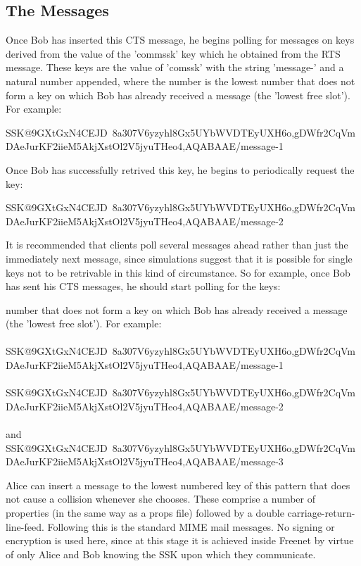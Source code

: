 \documentclass[12pt,a4paper]{article}
\begin{document}
\subsection{The Messages}
Once Bob has inserted this CTS message, he begins polling for messages on keys derived from the value of the 'commssk' key which he obtained from the RTS message. These keys are the value of 'comssk' with the string 'message-' and a natural number appended, where the number is the lowest number that does not form a key on which Bob has already received a message (the 'lowest free slot'). For example:

SSK@9GXtGxN4CEJD~8a30\-7V6yzyhl8Gx5UYb\-WVDTEyUXH6o,gDWfr2CqVmDAeJ\-urKF2iieM5AkjXs\-tOl2V5jyuTHeo4,AQABAAE/message-1

Once Bob has successfully retrived this key, he begins to periodically request the key:

SSK@9GXtGxN4CEJD~8a30\-7V6yzyhl8Gx5UYbW\-VDTEyUXH6o,gDWfr2CqVmDAeJ\-urKF2iieM5AkjXs\-tOl2V5jyuTHeo4,AQABAAE/message-2

It is recommended that clients poll several messages ahead rather than just the immediately next message, since simulations suggest that it is possible for single keys not to be retrivable in this kind of circumstance. So for example, once Bob has sent his CTS messages, he should start polling for the keys:

number that does not form a key on which Bob has already received a message (the 'lowest free slot'). For example: \\
\\
SSK@9GXtGxN4CEJD~8a\-307V6yzyhl8Gx5U\-YbWVDTEyUXH6o,gDWfr2CqVm\-DAeJurKF2iieM\-5AkjXstOl2V5j\-yuTHeo4,AQABAAE/message-1 \\
\\
SSK@9GXtGxN4CEJD~8a\-307V6yzyhl8Gx5U\-YbWVDTEyUXH6o,gDWfr2CqVm\-DAeJurKF2iieM\-5AkjXstOl2V5j\-yuTHeo4,AQABAAE/message-2 \\
\\
and \\
SSK@9GXtGxN4CEJD~8a\-307V6yzyhl8Gx5U\-YbWVDTEyUXH6o,gDWfr2CqVm\-DAeJurKF2iieM\-5AkjXstOl2V5j\-yuTHeo4,AQABAAE/message-3

Alice can insert a message to the lowest numbered key of this pattern that does not cause a collision whenever she chooses. These comprise a number of properties (in the same way as a props file) followed by a double carriage-return-line-feed. Following this is the standard MIME mail messages. No signing or encryption is used here, since at this stage it is achieved inside Freenet by virtue of only Alice and Bob knowing the SSK upon which they communicate.
\end{document}
